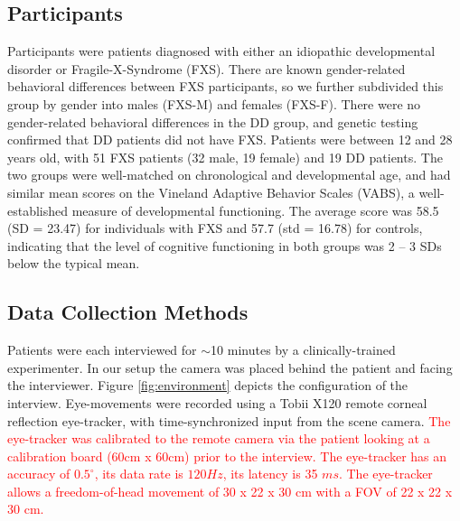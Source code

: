 \documentclass[10pt,twocolumn,letterpaper]{article}
\begin{document}
\subsection{Participants}
Participants were patients diagnosed with either an idiopathic developmental disorder or Fragile-X-Syndrome (FXS). There are known gender-related behavioral differences between FXS participants, so we further subdivided this group by gender into males (FXS-M) and females (FXS-F). There were no gender-related behavioral differences in the DD group, and genetic testing confirmed that DD patients did not have FXS. Patients were between 12 and 28 years old, with 51 FXS patients (32 male, 19 female) and 19 DD patients. The two groups were well-matched on chronological and developmental age, and had similar mean scores on the Vineland Adaptive Behavior Scales (VABS), a well-established measure of developmental functioning. The average score was 58.5 (SD = 23.47) for individuals with FXS and 57.7 (std = 16.78) for controls, indicating that the level of cognitive functioning in both groups was 2 -- 3 SDs below the typical mean.

\vspace{-0.1cm}
\subsection {Data Collection Methods}
\vspace{-0.1cm}
Patients were each interviewed for $\sim$10 minutes by a clinically-trained experimenter. In our setup the camera was placed behind the patient and facing the interviewer. 
Figure \ref{fig:environment} depicts the configuration of the interview. Eye-movements were recorded using a Tobii X120 remote corneal reflection eye-tracker, with time-synchronized input from the scene camera. \textcolor{red}{ The eye-tracker was calibrated to the remote camera via the patient looking at a calibration board (60cm x 60cm) prior to the interview. The eye-tracker has an accuracy of $0.5^{\circ}$, its data rate is $120 Hz$, its latency is 35 $ms$. The eye-tracker allows a freedom-of-head movement of 30 x 22 x 30 cm with a FOV of 22 x 22 x 30 cm.}
\end{document}
